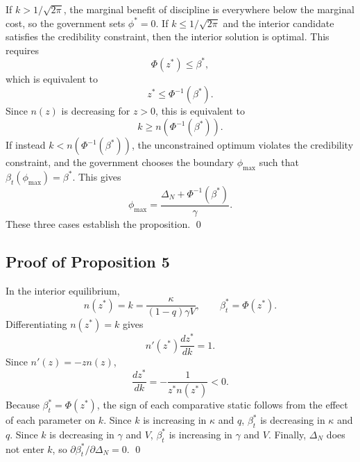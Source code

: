 If $k>1/\sqrt{2\pi}$, the marginal benefit of discipline is everywhere below the marginal cost, so the government sets $\phi^*=0$. If $k\leq 1/\sqrt{2\pi}$ and the interior candidate satisfies the credibility constraint, then the interior solution is optimal. This requires
\begin{equation}
    \Phi(z^*)\leq \beta^*,
\end{equation}
which is equivalent to
\begin{equation}
    z^*\leq \Phi^{-1}(\beta^*).
\end{equation}
Since $n(z)$ is decreasing for $z>0$, this is equivalent to
\begin{equation}
    k\geq n(\Phi^{-1}(\beta^*)).
\end{equation}
If instead $k<n(\Phi^{-1}(\beta^*))$, the unconstrained optimum violates the credibility constraint, and the government chooses the boundary $\phi_{\max}$ such that $\beta_t(\phi_{\max})=\beta^*$. This gives
\begin{equation}
    \phi_{\max}=\frac{\Delta_N+\Phi^{-1}(\beta^*)}{\gamma}.
\end{equation}
These three cases establish the proposition. \qed

\subsection{Proof of Proposition 5}

In the interior equilibrium,
\begin{equation}
    n(z^*)=k=\frac{\kappa}{(1-q)\gamma V}, \qquad \beta_t^*=\Phi(z^*).
\end{equation}
Differentiating $n(z^*)=k$ gives
\begin{equation}
    n'(z^*)\frac{dz^*}{dk}=1.
\end{equation}
Since $n'(z)=-zn(z)$,
\begin{equation}
    \frac{dz^*}{dk}=-\frac{1}{z^*n(z^*)}<0.
\end{equation}
Because $\beta_t^*=\Phi(z^*)$, the sign of each comparative static follows from the effect of each parameter on $k$. Since $k$ is increasing in $\kappa$ and $q$, $\beta_t^*$ is decreasing in $\kappa$ and $q$. Since $k$ is decreasing in $\gamma$ and $V$, $\beta_t^*$ is increasing in $\gamma$ and $V$. Finally, $\Delta_N$ does not enter $k$, so $\partial \beta_t^*/\partial \Delta_N=0$. \qed